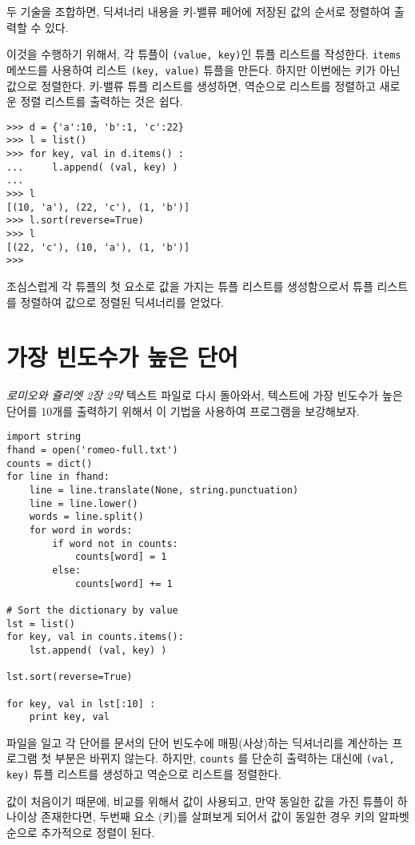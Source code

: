 두 기술을 조합하면, 딕셔너리 내용을 키-밸류 페어에 저장된 값의 순서로 정렬하여 출력할 수 있다.

이것을 수행하기 위해서, 각 튜플이 {\tt (value, key)}인 튜플 리스트를 작성한다. 
{\tt items} 메쏘드를 사용하여 리스트 {\tt (key, value)} 튜플을 만든다. 하지만 이번에는 키가 아닌 값으로 정렬한다.
키-밸류 튜플 리스트를 생성하면, 역순으로 리스트를 정렬하고 새로운 정렬 리스트를 출력하는 것은 쉽다.

\beforeverb
\begin{verbatim}
>>> d = {'a':10, 'b':1, 'c':22}
>>> l = list()
>>> for key, val in d.items() :
...     l.append( (val, key) )
... 
>>> l
[(10, 'a'), (22, 'c'), (1, 'b')]
>>> l.sort(reverse=True)
>>> l
[(22, 'c'), (10, 'a'), (1, 'b')]
>>> 
\end{verbatim}
\afterverb
%

조심스럽게 각 튜플의 첫 요소로 값을 가지는 튜플 리스트를 생성함으로서 튜플 리스트를 정렬하여 값으로 정렬된 딕셔너리를 얻었다.

\section{가장 빈도수가 높은 단어}


\emph{로미오와 쥴리엣 2장 2막} 텍스트 파일로 다시 돌아와서, 텍스트에 가장 빈도수가 높은 단어를 10개를 출력하기 위해서
이 기법을 사용하여 프로그램을 보강해보자.

\beforeverb
\begin{verbatim}
import string
fhand = open('romeo-full.txt')
counts = dict()
for line in fhand:
    line = line.translate(None, string.punctuation)
    line = line.lower()
    words = line.split()
    for word in words:
        if word not in counts:
            counts[word] = 1
        else:
            counts[word] += 1

# Sort the dictionary by value
lst = list()
for key, val in counts.items():
    lst.append( (val, key) )

lst.sort(reverse=True)

for key, val in lst[:10] :
    print key, val
\end{verbatim}
\afterverb
%

파일을 일고 각 단어를 문서의 단어 빈도수에 매핑(사상)하는 딕셔너리를 계산하는 프로그램 첫 부분은 바뀌지 않는다.
하지만, {\tt counts} 를 단순히 출력하는 대신에 {\tt (val, key)} 튜플 리스트를 생성하고 역순으로 리스트를 정렬한다.

값이 처음이기 때문에, 비교를 위해서 값이 사용되고, 만약 동일한 값을 가진 튜플이 하나이상 존재한다면, 두번째 요소 (키)를 살펴보게 되어서
값이 동일한 경우 키의 알파벳 순으로 추가적으로 정렬이 된다.

